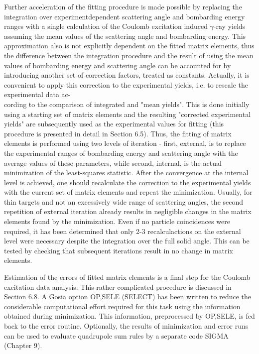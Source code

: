 \documentclass[10pt]{article}
\begin{document}
Further acceleration of the fitting procedure is made possible by replacing the integration over experimentdependent scattering angle and bombarding energy ranges with a single calculation of the Coulomb excitation induced $\gamma$-ray yields assuming the mean values of the scattering angle and bombarding energy. This approximation also is not explicitly dependent on the fitted matrix elements, thus the difference between the integration procedure and the result of using the mean values of bombarding energy and scattering angle can be accounted for by introducing another set of correction factors, treated as constants. Actually, it is convenient to apply this correction to the experimental yields, i.e. to rescale the experimental data ac-\\
cording to the comparison of integrated and "mean yields". This is done initially using a starting set of matrix elements and the resulting "corrected experimental yields" are subsequently used as the experimental values for fitting (this procedure is presented in detail in Section 6.5). Thus, the fitting of matrix elements is performed using two levels of iteration - first, external, is to replace the experimental ranges of bombarding energy and scattering angle with the average values of these parameters, while second, internal, is the actual minimization of the least-squares statistic. After the convergence at the internal level is achieved, one should recalculate the correction to the experimental yields with the current set of matrix elements and repeat the minimization. Usually, for thin targets and not an excessively wide range of scattering angles, the second repetition of external iteration already results in negligible changes in the matrix elements found by the minimization. Even if no particle coincidences were required, it has been determined that only 2-3 recalculactions on the external level were necessary despite the integration over the full solid angle. This can be tested by checking that subsequent iterations result in no change in matrix elements.

Estimation of the errors of fitted matrix elements is a final step for the Coulomb excitation data analysis. This rather complicated procedure is discussed in Section 6.8. A Gosia option OP,SELE (SELECT) has been written to reduce the considerable computational effort required for this task using the information obtained during minimization. This information, preprocessed by OP,SELE, is fed back to the error routine. Optionally, the results of minimization and error runs can be used to evaluate quadrupole sum rules by a separate code SIGMA (Chapter 9).
\end{document}
